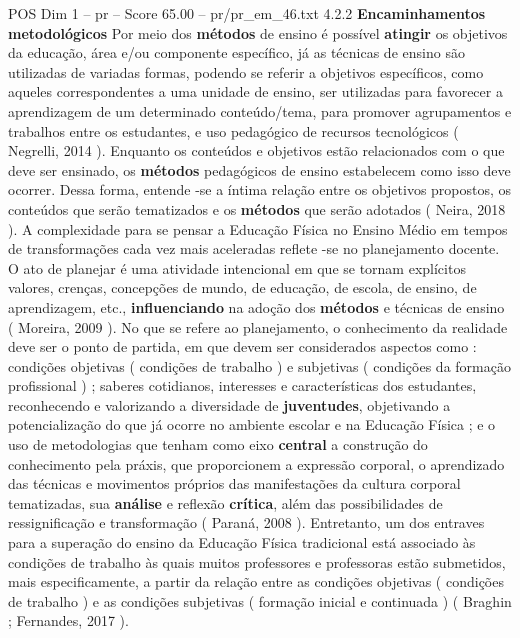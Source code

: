 \begin{textsample}{POS Dim 1 – pr – Score 65.00 – pr/pr\_em\_46.txt}  \label{ex:f1_pos_029}
4.2.2 \textbf{Encaminhamentos} \textbf{metodológicos} Por meio dos \textbf{métodos} de ensino é possível \textbf{atingir} os objetivos da educação, área e/ou componente específico, já as técnicas de ensino são utilizadas de variadas formas, podendo se referir a objetivos específicos, como aqueles correspondentes a uma unidade de ensino, ser utilizadas para favorecer a aprendizagem de um determinado conteúdo/tema, para promover agrupamentos e trabalhos entre os estudantes, e uso pedagógico de recursos tecnológicos ( Negrelli, 2014 ).
Enquanto os conteúdos e objetivos estão relacionados com o que deve ser ensinado, os \textbf{métodos} pedagógicos de ensino estabelecem como isso deve ocorrer.
Dessa forma, entende -se a íntima relação entre os objetivos propostos, os conteúdos que serão tematizados e os \textbf{métodos} que serão adotados ( Neira, 2018 ).
A complexidade para se pensar a Educação Física no Ensino Médio em tempos de transformações cada vez mais aceleradas reflete -se no planejamento docente.
O ato de planejar é uma atividade intencional em que se tornam explícitos valores, crenças, concepções de mundo, de educação, de escola, de ensino, de aprendizagem, etc., \textbf{influenciando} na adoção dos \textbf{métodos} e técnicas de ensino ( Moreira, 2009 ).
No que se refere ao planejamento, o conhecimento da realidade deve ser o ponto de partida, em que devem ser considerados aspectos como : condições objetivas ( condições de trabalho ) e subjetivas ( condições da formação profissional ) ; saberes cotidianos, interesses e características dos estudantes, reconhecendo e valorizando a diversidade de \textbf{juventudes}, objetivando a potencialização do que já ocorre no ambiente escolar e na Educação Física ; e o uso de metodologias que tenham como eixo \textbf{central} a construção do conhecimento pela práxis, que proporcionem a expressão corporal, o aprendizado das técnicas e movimentos próprios das manifestações da cultura corporal tematizadas, sua \textbf{análise} e reflexão \textbf{crítica}, além das possibilidades de ressignificação e transformação ( Paraná, 2008 ).
Entretanto, um dos entraves para a superação do ensino da Educação Física tradicional está associado às condições de trabalho às quais muitos professores e professoras estão submetidos, mais especificamente, a partir da relação entre as condições objetivas ( condições de trabalho ) e as condições subjetivas ( formação inicial e continuada ) ( Braghin ; Fernandes, 2017 ).

\end{textsample}
